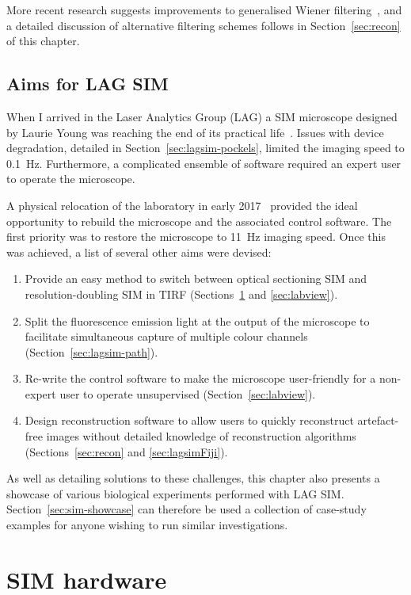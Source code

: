 More recent research suggests improvements to generalised Wiener filtering~\cite{righolt2013image, perez2016optimal, chakrova2016deconvolution}, and a detailed discussion of alternative filtering schemes follows in Section~\ref{sec:recon} of this chapter.


\subsection{Aims for LAG SIM}
When I arrived in the Laser Analytics Group (LAG) a SIM microscope designed by Laurie Young was reaching the end of its practical life~\cite{young2016guide}.
Issues with device degradation, detailed in Section~\ref{sec:lagsim-pockels}, limited the imaging speed to \SI{0.1}{\hertz}.
Furthermore, a complicated ensemble of software required an expert user to operate the microscope.

A physical relocation of the laboratory in early 2017~\cite{newbuilding} provided the ideal opportunity to rebuild the microscope and the associated control software. The first priority was to restore the microscope to \SI{11}{\hertz} imaging speed. Once this was achieved, a list of several other aims were devised:
\begin{enumerate}
	\item Provide an easy method to switch between optical sectioning SIM and resolution-doubling SIM in TIRF (Sections~\ref{sec:hardware} and \ref{sec:labview}).
	\item Split the fluorescence emission light at the output of the microscope to facilitate simultaneous capture of multiple colour channels (Section~\ref{sec:lagsim-path}).
	\item Re-write the control software to make the microscope user-friendly for a non-expert user to operate unsupervised (Section~\ref{sec:labview}).
	\item Design reconstruction software to allow users to quickly reconstruct artefact-free images without detailed knowledge of reconstruction algorithms (Sections~\ref{sec:recon} and \ref{sec:lagsimFiji}).
\end{enumerate}

As well as detailing solutions to these challenges, this chapter also presents a showcase of various biological experiments performed with LAG SIM.
Section~\ref{sec:sim-showcase} can therefore be used a collection of case-study examples for anyone wishing to run similar investigations.

\section{SIM hardware} \label{sec:hardware}
